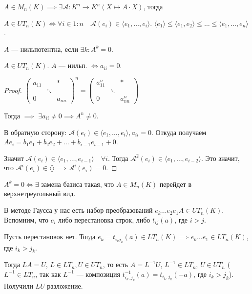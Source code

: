 \begin{remark}
    $A \in M_n(K) \implies \exists \mathcal{A}: K^n \rightarrow K^n (X \mapsto A\cdot X)$, тогда

    $A \in UT_n(K) \iff \forall i \in 1:n\quad \mathcal{A}(e_i) \in \langle e_1, \ldots, e_i \rangle$. $\langle e_1 \rangle \le \langle e_1, e_2 \rangle \le \ldots \le \langle e_1, \ldots, e_n \rangle$.
\end{remark}
\begin{definition}
    $A$ --- нильпотентна, если $\exists k\!: A^k = 0$.
\end{definition}
\begin{statement}
    $A \in UT_n(K)$.  $A$ --- нильп.  $\iff a_{ii} = 0$.
\end{statement}
\begin{proof}
    $\begin{pmatrix} a_{11} & & * \\ & \ddots & \\ 0 & & a_{nn} \end{pmatrix}^n = \begin{pmatrix} a_{11}^n & & * \\ & \ddots & \\ 0 & & a_{nn}^n \end{pmatrix}$

    Тогда $\implies$ $\exists a_{ii} \not = 0 \implies A^n \not = 0$.

    В обратную сторону:  $\mathcal{A}(e_i) \in \langle e_1, \ldots, e_i \rangle, a_{ii} = 0$. Откуда получаем $Ae_i = b_1e_1 + b_2e_2 + \ldots + b_{i-1}e_{i-1} + 0$.

    Значит $\mathcal{A}(e_i) \in \langle e_1, \ldots, e_{i-1} \rangle \quad \forall i$. Тогда $\mathcal{A}^2(e_i) \in \langle e_1,\ldots, e_{i-2} \rangle$. Это значит, что $\mathcal{A}^i(e_i) \in \langle \rangle \implies \mathcal{A}^i(e_i) = 0$.
\end{proof}
\begin{remark}
    $A^k = 0 \iff \exists $ замена базиса  такая, что $A \in M_n(K)$ перейдет в верхнетреугольный вид.

\end{remark}
В методе Гаусса у нас есть набор преобразований $e_k\ldots e_2e_1A \in UT_n(K)$. Вспомним, что $e_i$ либо перестановка строк, либо  $t_{ij}(a)$, где  $i > j$.

Пусть перестановок нет. Тогда  $e_k = t_{i_k j_k}(a) \in LT_n(K) \implies e_k \ldots e_1 \in LT_n(K)$, где $i_k > j_k$.

Тогда  $LA = U$,  $L \in LT_n, U \in UT_n$, то есть  $A = L^{-1}U$,  $L^{-1} \in LT_n$,  $U \in UT_n$ ($L^{-1} \in LT_n$, так как $L^{-1}$ --- композиция $t_{i_k,j_k}^{-1}(a)=t_{i_k,j_k}(-a)$, где $i_k>j_k$). Получили  $LU$ разложение.

